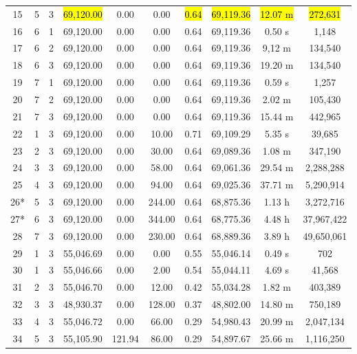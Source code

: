 \documentclass{singlecol}
\theoremstyle{TH}{
\newtheorem{lemma}{Lemma}
\newtheorem{theorem}[lemma]{Theorem}
\newtheorem{corrolary}[lemma]{Corrolary}
\newtheorem{conjecture}[lemma]{Conjecture}
\newtheorem{proposition}[lemma]{Proposition}
\newtheorem{claim}[lemma]{Claim}
\newtheorem{stheorem}[lemma]{Wrong Theorem}
\newtheorem{algorithm}{Algorithm}
}
\theoremstyle{THrm}{
\newtheorem{definition}{Definition}[section]
\newtheorem{question}{Question}[section]
\newtheorem{remark}{Remark}
\newtheorem{scheme}{Scheme}
}
\theoremstyle{THhit}{
\newtheorem{case}{Case}[section]
}
\begin{document}
\begin{table}[h!]
\begin{center}
\begin{small}
\begin{tabular}{ c c c c c c c c c c }
	 15  &  5 & 3  & \hl{69,120.00}  &  0.00  & 0.00 &  \hl{0.64}   &   \hl{69,119.36}  & \hl{12.07 m} & \hl{272,631}     \\
	 16  &  6 & 1  & 69,120.00 & 0.00  & 0.00 & 0.64 & 69,119.36 & 0.50 s & 1,148 \\
	 17  &  6 & 2  & 69,120.00 & 0.00  & 0.00 &  0.64 & 69,119.36  & 9,12 m & 134,540 \\
	 18  &  6 & 3  & 69,120.00 &  0.00  & 0.00 & 0.64 &   69,119.36  & 19.20 m & 134,540 \\
	 19  &  7 & 1  & 69,120.00  &  0.00  & 0.00 &  0.64  &   69,119.36  & 0.59 s & 1,257 \\
	 20  &  7 & 2  & 69,120.00 &  0.00 & 0.00 &  0.64 & 69,119.36 & 2.02 m & 105,430 \\
	 21  &  7 & 3  & 69,120.00 &  0.00  & 0.00 &  0.64  & 69,119.36 & 15.44 m & 442,965 \\
     22  &  1 & 3  & 69,120.00 &  0.00  & 10.00 &  0.71 &   69,109.29  & 5.35 s & 39,685 \\
	 23  &  2 & 3  & 69,120.00 &  0.00 & 30.00 &  0.64 &   69,089.36 & 1.08 m & 347,190 \\
	 24  & 3 & 3  & 69,120.00 &  0.00  & 58.00 & 0.64 &   69,061.36  & 29.54 m & 2,288,288 \\
	 25  & 4 & 3  & 69,120.00  &  0.00  & 94.00 &  0.64 &   69,025.36  & 37.71 m & 5,290,914 \\
     26*  & 5 & 3  & 69,120.00 &  0.00  & 244.00 &  0.64 &   68,875.36  & 1.13 h & 3,272,716 \\
	 27*  & 6 & 3  & 69,120.00 &  0.00 & 344.00 &  0.64   &   68,775.36  & 4.48 h & 37,967,422 \\
	 28  & 7 & 3  & 69,120.00  &  0.00  & 230.00 &  0.64 &   68,889.36  & 3.89 h & 49,650,061 \\
	 29  & 1 & 3  & 55,046.69  &  0.00  & 0.00 & 0.55 & 55,046.14  & 0.49 s & 702 \\
	 30  & 1 & 3  & 55,046.66  &  0.00 & 2.00 &  0.54   &   55,044.11  & 4.69 s & 41,568\\
	 31  & 2 & 3  & 55,046.70  &  0.00 & 12.00 &  0.42   &   55,034.28  & 1.82 m & 403,389 \\
	 32  & 3 & 3  & 48,930.37  & 0.00 & 128.00 &  0.37   &   48,802.00  & 14.80 m & 750,189 \\
	 33  & 4 & 3  & 55,046.72 &  0.00 & 66.00 &  0.29   &   54,980.43  & 20.99 m & 2,047,134 \\
	 34  & 5 & 3  & 55,105.90  &  121.94  & 86.00 &  0.29   &   54,897.67  & 25.66 m & 1,116,250 \\

\end{tabular}
\end{small}
\end{center}
\end{table}
\end{document}
